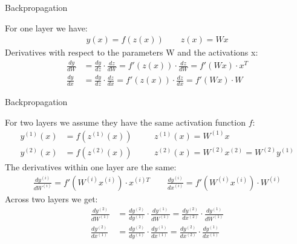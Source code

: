 \documentclass[aspectratio=169]{beamer}
\begin{document}

\begin{frame}{Backpropagation}

For one layer we have:
\begin{align}
y(x) = f(z(x)) \qquad z(x) = W x 
\end{align}
Derivatives with respect to the parameters W and the activations x:
\begin{align}
\frac{d y} { d W} &= \frac{ d y} {d z} \cdot \frac{d z} {d W} = f'(z(x)) \cdot \frac{d z} { d W} = f'(Wx) \cdot x^T \\
\frac{d y} { d x} &= \frac{ d y} {d z} \cdot \frac{d z} {d x} = f'(z(x)) \cdot \frac{d z} { d x} = f'(Wx) \cdot W
\end{align}

\end{frame}


\begin{frame}{Backpropagation}

For two layers we assume they have the same activation function $f$:
\begin{align}
y^{(1)}(x) &= f(z^{(1)}(x)) \quad && z^{(1)}(x) = W^{(1)} x \\
y^{(2)}(x) &= f(z^{(2)}(x)) \quad && z^{(2)}(x) = W^{(2)} x^{(2)} = W^{(2)} y^{(1)}
\end{align}
The derivatives within one layer are the same:
\begin{align}
\frac{d y^{(i)}} { d W^{(i)}} = f' (W^{(i)} x^{(i)}) \cdot x^{(i) T} \qquad
\frac{d y^{(i)}} { d x^{(i)}} = f'(W^{(i)} x^{(i)}) \cdot W^{(i)}
\end{align}
Across two layers we get:
\begin{align}
\frac{d y^{(2)}} { d W^{(1)}} &= \frac{ d y^{(2)}} {d y^{(1)}} \cdot \frac{d y^{(1)}} {d W^{(1)}} = 
\frac{ d y^{(2)}} {d x^{(2)}} \cdot \frac{d y^{(1)}} {d W^{(1)}}  \\
\frac{d y^{(2)}} { d x^{(1)}} &= \frac{ d y^{(2)}} {d y^{(1)}} \cdot \frac{d y^{(1)}} {d x^{(1)}} = 
\frac{ d y^{(2)}} {d x^{(2)}} \cdot \frac{d y^{(1)}} {d x^{(1)}}  
\end{align}
 
\end{frame}

\end{document}
